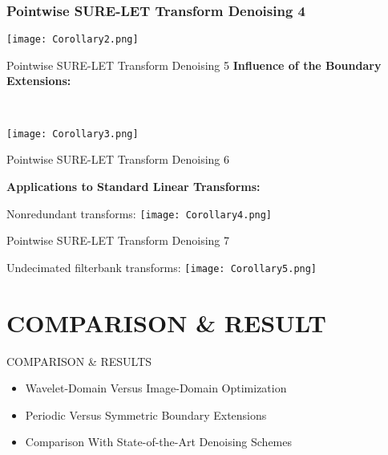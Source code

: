 \documentclass{beamer}
\begin{document}
	
	\begin{frame}
		\frametitle{Pointwise SURE-LET Transform Denoising 4}
\texttt{[image: Corollary2.png]}	
	\end{frame}
	
	
	\begin{frame}{Pointwise SURE-LET Transform Denoising 5}
\textbf{Influence of the Boundary Extensions:}
	
	\
	
	\texttt{[image: Corollary3.png]}
	
\end{frame}

	
	
	

		\begin{frame}{Pointwise SURE-LET Transform Denoising 6}

\textbf{Applications to Standard Linear Transforms:}
\begin{block}{Nonredundant transforms:}
\texttt{[image: Corollary4.png]}
\end{block}




	
	
	\end{frame}
	

	
	
	
	
	\begin{frame}{Pointwise SURE-LET Transform Denoising 7}
	
	\begin{block}{Undecimated filterbank transforms:}
		\texttt{[image: Corollary5.png]}
	\end{block}
	
\end{frame}



\section{COMPARISON \& RESULT}	
	
	
	\begin{frame}{COMPARISON \& RESULTS}
	\begin{itemize}
		\item  Wavelet-Domain Versus Image-Domain Optimization
		\item Periodic Versus Symmetric Boundary Extensions
		\item Comparison With State-of-the-Art Denoising Schemes
	\end{itemize}
	
	
\end{frame}
\end{document}
